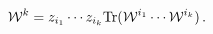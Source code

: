 \begin{equation}\label{prO} 
{\cal W}^{k} = z_{i_1} \cdots z_{i_k} \mbox{Tr}({\cal W}^{i_1} \cdots 
{\cal W}^{i_k}) \, . 
\end{equation}

